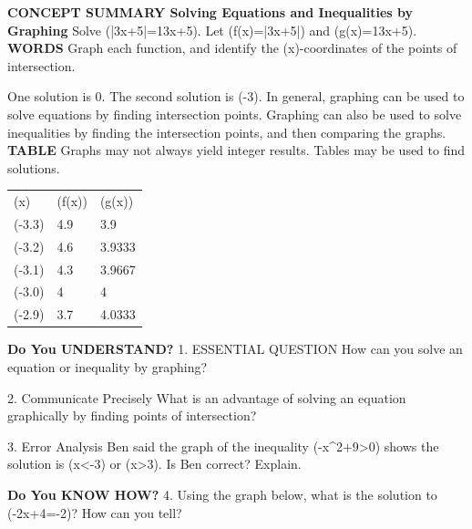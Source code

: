 \documentclass{article}
\newenvironment{concept-summary}{}{}    %
\newcommand{\answer}[1]{}               %
\newcommand{\placeholder}[2]{}          %
\newcommand{\te}[1]{}                   %
\begin{document}
\begin{concept-summary}
\textbf{CONCEPT SUMMARY Solving Equations and Inequalities by Graphing}
Solve (|3x+5|=\frac13x+5).
Let (f(x)=|3x+5|) and (g(x)=\frac13x+5).
\textbf{WORDS} Graph each function, and identify the (x)-coordinates of the points of intersection.
\placeholder{graph}{Calculator graph: orange V f(x)=|3x+5|, vertex (-5/3,0), and blue line g(x)=x/3+5. Black cursor at (0,5); readout x=0 y=5. Unit grid, unlabeled axes and tick marks; clipped curves have no arrowheads. Other intersection (-3,4).}
One solution is 0. The second solution is (-3).
In general, graphing can be used to solve equations by finding intersection points. Graphing can also be used to solve inequalities by finding the intersection points, and then comparing the graphs.
\textbf{TABLE} Graphs may not always yield integer results. Tables may be used to find solutions.
\begin{tabular}{lll}
(x) & (f(x)) & (g(x)) \\
(-3.3) & 4.9 & 3.9 \\
(-3.2) & 4.6 & 3.9333 \\
(-3.1) & 4.3 & 3.9667 \\
(-3.0) & 4 & 4 \\
(-2.9) & 3.7 & 4.0333 \\
\end{tabular}
\te{The row for x=-3.0 is highlighted red.}
\textbf{Do You UNDERSTAND?}
1. ESSENTIAL QUESTION How can you solve an equation or inequality by graphing?
\answer{To solve an equation by graphing, write two new equations by setting y equal to the expression on either side of the equals sign. Then graph the two equations and identify the points of intersection. For an inequality, determine whether values of x to the left of or to the right of the point of intersection satisfy the inequality.}
2. Communicate Precisely What is an advantage of solving an equation graphically by finding points of intersection?
\answer{Solving an equation graphically by finding points of intersection can be helpful when the equations are complicated or impossible to solve algebraically. Also it can be useful when estimating solutions.}
3. Error Analysis Ben said the graph of the inequality (-x^2+9>0) shows the solution is (x<-3) or (x>3). Is Ben correct? Explain.
\answer{No; Ben found the solution of the inequality (-x^2+9<0). The correct solution is (-3<x<3).}
\textbf{Do You KNOW HOW?}
4. Using the graph below, what is the solution to (-2x+4=-2)? How can you tell?
\placeholder{graph}{Square unit grid with x and y axes, arrowheads, and labels -4,-2,O,2,4. Red line y=-2x+4 and blue horizontal line y=-2, both with arrows at both ends, intersect at (3,-2). Window approximately [-5,5] on each axis.}
\answer{(x=3); The x-coordinate of the intersection point is 3.}
\end{concept-summary}
\end{document}
